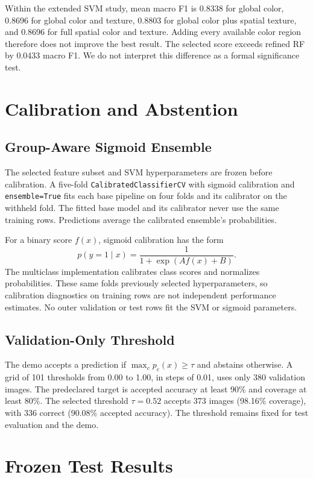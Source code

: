 \documentclass[conference]{IEEEtran}
\begin{document}
Within the extended SVM study, mean macro F1 is 0.8338 for global color, 0.8696 for global color and texture, 0.8803 for global color plus spatial texture, and 0.8696 for full spatial color and texture. Adding every available color region therefore does not improve the best result. The selected score exceeds refined RF by 0.0433 macro F1. We do not interpret this difference as a formal significance test.

\section{Calibration and Abstention}
\subsection{Group-Aware Sigmoid Ensemble}
The selected feature subset and SVM hyperparameters are frozen before calibration. A five-fold \texttt{CalibratedClassifierCV} with sigmoid calibration and \texttt{ensemble=True} fits each base pipeline on four folds and its calibrator on the withheld fold. The fitted base model and its calibrator never use the same training rows. Predictions average the calibrated ensemble's probabilities.

For a binary score $f(x)$, sigmoid calibration has the form
\begin{equation}
 p(y=1\mid x)=\frac{1}{1+\exp(Af(x)+B)}.
\end{equation}
The multiclass implementation calibrates class scores and normalizes probabilities. These same folds previously selected hyperparameters, so calibration diagnostics on training rows are not independent performance estimates. No outer validation or test rows fit the SVM or sigmoid parameters.

\subsection{Validation-Only Threshold}
The demo accepts a prediction if $\max_c p_c(x)\geq\tau$ and abstains otherwise. A grid of 101 thresholds from 0.00 to 1.00, in steps of 0.01, uses only 380 validation images. The predeclared target is accepted accuracy at least 90\% and coverage at least 80\%. The selected threshold $\tau=0.52$ accepts 373 images (98.16\% coverage), with 336 correct (90.08\% accepted accuracy). The threshold remains fixed for test evaluation and the demo.

\section{Frozen Test Results}
\end{document}
